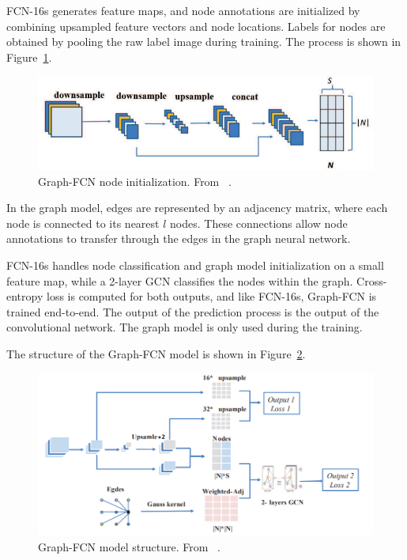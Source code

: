 FCN-16s generates feature maps, and node annotations are initialized by combining upsampled feature vectors and node locations. Labels for nodes are obtained by pooling the raw label image during training. The process is shown in Figure~\ref{fig:graphfcn_node_init}.

\begin{figure}
    \centering
    \includegraphics[width=0.8\linewidth]{images/graphfcn_node_init.png}
    \caption{Graph-FCN node initialization. From ~\cite{lu2020graphfcnimagesemanticsegmentation}.}
    \label{fig:graphfcn_node_init}
\end{figure}

In the graph model, edges are represented by an adjacency matrix, where each node is connected to its nearest $l$ nodes. These connections allow node annotations to transfer through the edges in the graph neural network.

FCN-16s handles node classification and graph model initialization on a small feature map, while a 2-layer GCN classifies the nodes within the graph. Cross-entropy loss is computed for both outputs, and like FCN-16s, Graph-FCN is trained end-to-end. The output of the prediction process is the output of the convolutional network. The graph model is only used during the training.

The structure of the Graph-FCN model is shown in Figure~\ref{fig:graphfcn_structure}.
\begin{figure}
    \centering
    \includegraphics[width=0.8\linewidth]{images/graphfcn_structure.png}
    \caption{Graph-FCN model structure. From ~\cite{lu2020graphfcnimagesemanticsegmentation}.}
    \label{fig:graphfcn_structure}
\end{figure}

